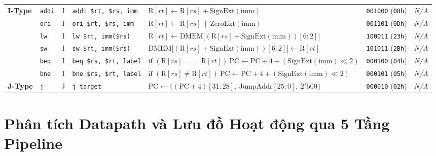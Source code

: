 \documentclass[12pt,a4paper]{report}
\begin{document}
\begin{table}[H]
{\begin{tabular}{@{}llcllcc@{}}
\multirow{6}{*}{\textbf{I-Type}}
 & \texttt{addi}& I & \texttt{addi \$rt, \$rs, imm} & $\text{R}[rt] \leftarrow \text{R}[rs] + \text{SignExt}(\text{imm})$ & \texttt{001000} (\texttt{08h}) & \textit{N/A} \\
 & \texttt{ori} & I & \texttt{ori \$rt, \$rs, imm}  & $\text{R}[rt] \leftarrow \text{R}[rs] \ \mid \ \text{ZeroExt}(\text{imm})$ & \texttt{001101} (\texttt{0Dh}) & \textit{N/A} \\
 & \texttt{lw}  & I & \texttt{lw \$rt, imm(\$rs)}   & $\text{R}[rt] \leftarrow \text{DMEM}\big[(\text{R}[rs] + \text{SignExt}(\text{imm}))[6:2]\big]$ & \texttt{100011} (\texttt{23h}) & \textit{N/A} \\
 & \texttt{sw}  & I & \texttt{sw \$rt, imm(\$rs)}   & $\text{DMEM}\big[(\text{R}[rs] + \text{SignExt}(\text{imm}))[6:2]\big] \leftarrow \text{R}[rt]$ & \texttt{101011} (\texttt{2Bh}) & \textit{N/A} \\
 & \texttt{beq} & I & \texttt{beq \$rs, \$rt, label}& $\text{if } (\text{R}[rs] == \text{R}[rt]) \ \text{PC} \leftarrow \text{PC} + 4 + (\text{SignExt}(\text{imm}) \ll 2)$ & \texttt{000100} (\texttt{04h}) & \textit{N/A} \\
 & \texttt{bne} & I & \texttt{bne \$rs, \$rt, label}& $\text{if } (\text{R}[rs] \neq \text{R}[rt]) \ \text{PC} \leftarrow \text{PC} + 4 + (\text{SignExt}(\text{imm}) \ll 2)$ & \texttt{000101} (\texttt{05h}) & \textit{N/A} \\ \midrule
\textbf{J-Type}
 & \texttt{j}   & J & \texttt{j target}             & $\text{PC} \leftarrow \{(\text{PC}+4)[31:28], \ \text{JumpAddr}[25:0], \ 2'\text{b}00\}$ & \texttt{000010} (\texttt{02h}) & \textit{N/A} \\ \bottomrule
\end{tabular}%
}
\end{table}

\section{Phân tích Datapath và Lưu đồ Hoạt động qua 5 Tầng Pipeline}
\end{document}
